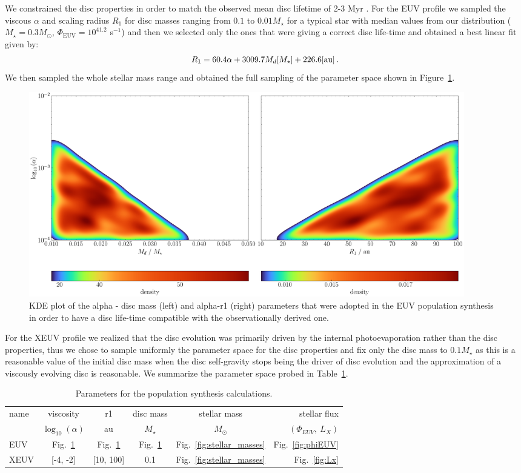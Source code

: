 \documentclass[fleqn,usenatbib,letters]{mnras}
\begin{document}
We constrained the disc properties in order to match the observed mean disc lifetime of 2-3 Myr \citep[see e.g.][]{Ribas2014}. For the EUV profile we sampled the viscous $\alpha$ and scaling radius $R_1$ for disc masses ranging from $0.1$ to $0.01 M_\star$ for a typical star with median values from our distribution ($M_\star = 0.3 M_\odot$, $\Phi_\mathrm{EUV} = 10^{41.2}$ s$^{-1}$) and then we selected only the ones that were giving a correct disc life-time and obtained a best linear fit given by:
\begin{equation}
    R_1 = 60.4 \alpha + 3009.7 M_d [M_\star] + 226.6 \\\text{[au]} \,.
\end{equation}
We then sampled the whole stellar mass range and obtained the full sampling of the parameter space shown in Figure~\ref{fig:param_euv}.
\begin{figure}
    \includegraphics[width=0.92\textwidth]{Fig5}
    \caption{KDE plot of the alpha - disc mass (left) and alpha-r1 (right) parameters that were adopted in the EUV population synthesis in order to have a disc life-time compatible with the observationally derived one. \label{fig:param_euv}}
\end{figure}
For the XEUV profile we realized that the disc evolution was primarily driven by the internal photoevaporation rather than the disc properties, thus we chose to sample uniformly the parameter space for the disc properties and fix only the disc mass to $0.1 M_\star$ as this is a reasonable value of the initial disc mass when the disc self-gravity stops being the driver of disc evolution and the approximation of a viscously evolving disc is reasonable. We summarize the parameter space probed in Table~\ref{tab:popsynthtable}.
\begin{table}
	\centering
	\caption{Parameters for the population synthesis calculations.}
	\label{tab:popsynthtable}
	\begin{tabular}{lccccr}
        \hline
		\hline
		  name & viscosity & r1 & disc mass & stellar mass & stellar flux \\
        & $\log_{10}(\alpha)$ & au & $M_\star$ & $M_\odot$ & $(\Phi_{EUV},\ L_X)$\\
		\hline
		  EUV & Fig.~\ref{fig:param_euv} & Fig.~\ref{fig:param_euv} & Fig.~\ref{fig:param_euv} & Fig.~\ref{fig:stellar_masses} & Fig.~\ref{fig:phiEUV}\\
		XEUV & [-4, -2] & [10, 100] & 0.1 & Fig.~\ref{fig:stellar_masses} & Fig.~\ref{fig:Lx}\\
		\hline
	\end{tabular}
\end{table}
\end{document}

